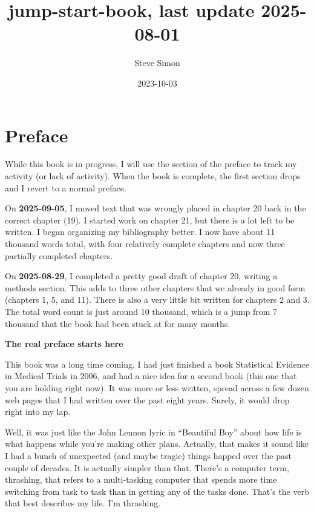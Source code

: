 \documentclass[
  letterpaper,
  DIV=11,
  numbers=noendperiod]{scrreprt}
\title{jump-start-book, last update 2025-08-01}
\author{Steve Simon}
\date{2023-10-03}
\renewcommand*\contentsname{Table of contents}
\newcommand\contentsname{Table of contents}
\begin{document}
\maketitle

\renewcommand*\contentsname{Table of contents}
{
\hypersetup{linkcolor=}
\setcounter{tocdepth}{2}
\tableofcontents
}


\chapter*{Preface}\label{preface}


While this book is in progress, I will use the section of the preface to
track my activity (or lack of activity). When the book is complete, the
first section drops and I revert to a normal preface.

On \textbf{2025-09-05}, I moved text that was wrongly placed in chapter
20 back in the correct chapter (19). I started work on chapter 21, but
there is a lot left to be written. I began organizing my bibliography
better. I now have about 11 thousand words total, with four relatively
complete chapters and now three partially completed chapters.

On \textbf{2025-08-29}, I completed a pretty good draft of chapter 20,
writing a methods section. This adds to three other chapters that we
already in good form (chapters 1, 5, and 11). There is also a very
little bit written for chapters 2 and 3. The total word count is just
around 10 thousand, which is a jump from 7 thousand that the book had
been stuck at for many months.

\textbf{The real preface starts here}

This book was a long time coming. I had just finished a book Statistical
Evidence in Medical Trials in 2006, and had a nice idea for a second
book (this one that you are holding right now). It was more or less
written, spread across a few dozen web pages that I had written over the
past eight years. Surely, it would drop right into my lap.

Well, it was just like the John Lennon lyric in ``Beautiful Boy'' about
how life is what happens while you're making other plans. Actually, that
makes it sound like I had a bunch of unexpected (and maybe tragic)
things happed over the past couple of decades. It is actually simpler
than that. There's a computer term, thrashing, that refers to a
multi-tasking computer that spends more time switching from task to task
than in getting any of the tasks done. That's the verb that best
describes my life. I'm thrashing.
\end{document}
